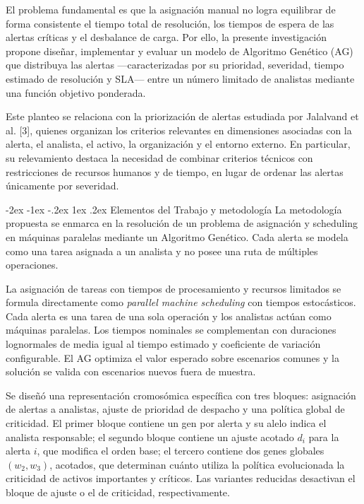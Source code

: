 \documentclass[12pt,a4paper,twocolumn]{article}
\makeatletter
\renewcommand{\section}{\@startsection{section}{1}{\z@}%
  {-2ex \@plus -1ex \@minus -.2ex}%
  {1ex \@plus.2ex}%
  {\fontsize{12}{14}\selectfont\bfseries}}
\makeatother
\begin{document}
El problema fundamental es que la asignación manual no logra equilibrar de forma consistente el tiempo total de resolución, los tiempos de espera de las alertas críticas y el desbalance de carga. Por ello, la presente investigación propone diseñar, implementar y evaluar un modelo de Algoritmo Genético (AG) que distribuya las alertas ---caracterizadas por su prioridad, severidad, tiempo estimado de resolución y SLA--- entre un número limitado de analistas mediante una función objetivo ponderada.

Este planteo se relaciona con la priorización de alertas estudiada por Jalalvand et al. [3], quienes organizan los criterios relevantes en dimensiones asociadas con la alerta, el analista, el activo, la organización y el entorno externo. En particular, su relevamiento destaca la necesidad de combinar criterios técnicos con restricciones de recursos humanos y de tiempo, en lugar de ordenar las alertas únicamente por severidad.

\section{Elementos del Trabajo y metodología}
La metodología propuesta se enmarca en la resolución de un problema de asignación y scheduling en máquinas paralelas mediante un Algoritmo Genético. Cada alerta se modela como una tarea asignada a un analista y no posee una ruta de múltiples operaciones.

La asignación de tareas con tiempos de procesamiento y recursos limitados se formula directamente como \textit{parallel machine scheduling} con tiempos estocásticos. Cada alerta es una tarea de una sola operación y los analistas actúan como máquinas paralelas. Los tiempos nominales se complementan con duraciones lognormales de media igual al tiempo estimado y coeficiente de variación configurable. El AG optimiza el valor esperado sobre escenarios comunes y la solución se valida con escenarios nuevos fuera de muestra.

Se diseñó una representación cromosómica específica con tres bloques: asignación de alertas a analistas, ajuste de prioridad de despacho y una política global de criticidad. El primer bloque contiene un gen por alerta y su alelo indica el analista responsable; el segundo bloque contiene un ajuste acotado $d_i$ para la alerta $i$, que modifica el orden base; el tercero contiene dos genes globales $(w_2,w_3)$, acotados, que determinan cuánto utiliza la política evolucionada la criticidad de activos importantes y críticos. Las variantes reducidas desactivan el bloque de ajuste o el de criticidad, respectivamente.
\end{document}
